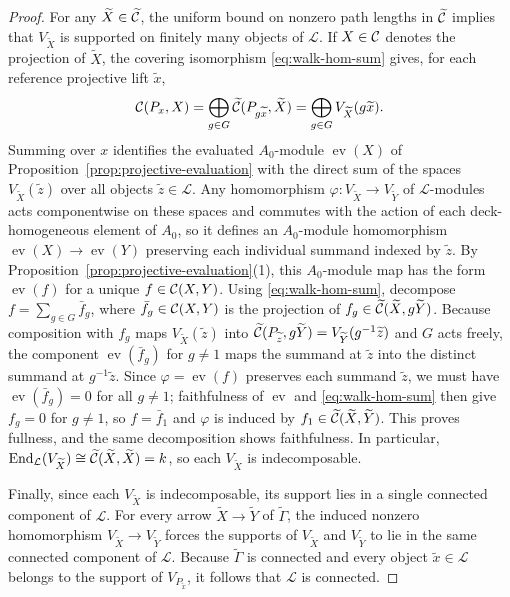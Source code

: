 \begin{proof}
For any $\widetilde X\in\widetilde{\mathcal C}$, the uniform bound on nonzero path
lengths in $\widetilde{\mathcal C}$ implies that $V_{\widetilde X}$ is supported on
finitely many objects of $\mathcal L$. If $X\in\mathcal C$ denotes the projection of
$\widetilde X$, the covering isomorphism \eqref{eq:walk-hom-sum} gives, for
each reference projective lift $\widetilde x$,
\[
 \mathcal C(P_x,X)=\bigoplus_{g\in G}\widetilde{\mathcal C}(P_{g\widetilde x},\widetilde X)
 =\bigoplus_{g\in G}V_{\widetilde X}(g\widetilde x).
\]
Summing over $x$ identifies the evaluated $A_0$-module $\operatorname{ev}(X)$
of Proposition~\ref{prop:projective-evaluation} with the direct sum of the
spaces $V_{\widetilde X}(\widetilde z)$ over all objects
$\widetilde z\in\mathcal L$. Any homomorphism
$\varphi:V_{\widetilde X}\to V_{\widetilde Y}$ of $\mathcal L$-modules
acts componentwise on these spaces and commutes with the action of each
deck-homogeneous element of $A_0$, so it defines an $A_0$-module
homomorphism $\operatorname{ev}(X)\to\operatorname{ev}(Y)$ preserving each
individual summand indexed by $\widetilde z$. By
Proposition~\ref{prop:projective-evaluation}(1), this $A_0$-module map has
the form $\operatorname{ev}(f)$ for a unique $f\in\mathcal C(X,Y)$. Using
\eqref{eq:walk-hom-sum}, decompose $f=\sum_{g\in G}\bar f_g$, where
$\bar f_g\in\mathcal C(X,Y)$ is the projection of $f_g\in\widetilde{\mathcal C}(\widetilde X,g\widetilde Y)$.
Because composition with $f_g$ maps $V_{\widetilde X}(\widetilde z)$ into
$\widetilde{\mathcal C}(P_{\widetilde z},g\widetilde Y)=V_{\widetilde Y}(g^{-1}\widetilde z)$
and $G$ acts freely, the component $\operatorname{ev}(\bar f_g)$ for $g\ne1$
maps the summand at $\widetilde z$ into the distinct summand at
$g^{-1}\widetilde z$. Since $\varphi=\operatorname{ev}(f)$ preserves each
summand $\widetilde z$, we must have $\operatorname{ev}(\bar f_g)=0$ for all
$g\ne1$; faithfulness of $\operatorname{ev}$ and \eqref{eq:walk-hom-sum}
then give $f_g=0$ for $g\ne1$, so $f=\bar f_1$ and $\varphi$ is induced by
$f_1\in\widetilde{\mathcal C}(\widetilde X,\widetilde Y)$. This proves fullness, and
the same decomposition shows faithfulness. In particular,
$\operatorname{End}_{\mathcal L}(V_{\widetilde X})\cong\widetilde{\mathcal C}(\widetilde X,\widetilde X)=k$,
so each $V_{\widetilde X}$ is indecomposable.

Finally, since each $V_{\widetilde X}$ is indecomposable, its support lies in
a single connected component of $\mathcal L$. For every arrow
$\widetilde X\to\widetilde Y$ of $\widetilde\Gamma$, the induced nonzero
homomorphism $V_{\widetilde X}\to V_{\widetilde Y}$ forces the supports of
$V_{\widetilde X}$ and $V_{\widetilde Y}$ to lie in the same connected
component of $\mathcal L$. Because $\widetilde\Gamma$ is connected and every
object $\widetilde x\in\mathcal L$ belongs to the support of
$V_{P_{\widetilde x}}$, it follows that $\mathcal L$ is connected.
\end{proof}


